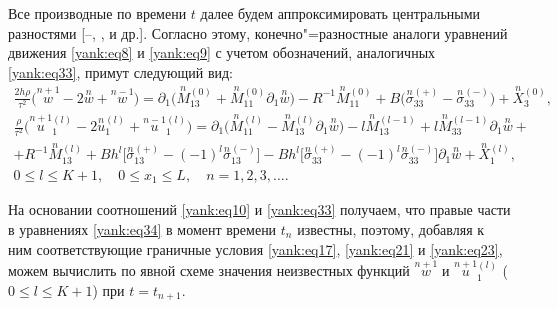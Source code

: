 Все производные по времени $t$ далее будем аппроксимировать центральными
разностями [--, ,  и др.]. Согласно этому, конечно"=разностные
аналоги уравнений движения \eqref{yank:eq8} и \eqref{yank:eq9} с учетом обозначений, аналогичных \eqref{yank:eq33},
примут следующий вид:
\begin{multline}
\label{yank:eq34}
\frac{2h\rho }{\tau ^2}\bigl(\overset{n+1}{w} -2\overset{n}{w} +\overset{n-1}{w} \bigr)=
\partial_1 \bigl( \overset{n}{M}{}_{13}^{(0)} +\overset{n}{M}{}_{11}^{(0)} \partial _1 \overset{n}{w} \bigr) -R^{-1}\overset{n}{M}{}_{11}^{(0)} +B\bigl( \overset{n}{\sigma}{}_{33}^{(+)} -
\overset{n}{\sigma}{}_{33}^{(-)}\bigr)+\overset{n}{X}{}_3^{(0)}, 
\\
\frac{\rho }{\tau ^2}\bigl( \overset{n+1}{u}{}_1^{(l)} -2\overset{n}{u}{}_1^{(l)} +\overset{n-1}{u}{}_1^{(l)} \bigr)=
\partial _1 \bigl( \overset{n}{M}{}_{11}^{(l)} -\overset{n}{M}{}_{13}^{(l)} \partial _1 \overset{n}{w} \bigr)-l\overset{n}{M}{}_{13}^{(l-1)} +l\overset{n}{M}{}_{33}^{(l-1)} \partial _1 \overset {n}{w} + \\
 +R^{-1}\overset{n}{M}{}_{13}^{(l)}+Bh^l 
 \bigl[\overset{n}{\sigma}{} _{13}^{(+)} -(-1)^l \overset{n}{\sigma}{}_{13}^{(-)} \bigr]-
 Bh^l\bigl[\overset{n}{\sigma}{}_{33}^{(+)} -(-1)^l \overset{n}{\sigma}{}_{33}^{(-)} \bigr]\partial _1 \overset{n}{w} +\overset{n}{X}{}_1^{(l)}, \\
0\le l\le K+1,\quad 0\le x_1 \le L,\quad n=1, 2, 3, \ldots . \qquad
\end{multline}

На основании соотношений \eqref{yank:eq10} и \eqref{yank:eq33} получаем, что правые части в уравнениях
\eqref{yank:eq34} в момент времени $t_n$ известны, поэтому, добавляя к ним
соответствующие граничные условия \eqref{yank:eq17}, \eqref{yank:eq21} и \eqref{yank:eq23}, можем вычислить по
явной схеме значения неизвестных функций $\overset{n+1}{w}$ и
$\overset{n+1}{u}{}_1^{(l)}$ ($0\le l\le K+1$) при $t=t_{n+1}$.

